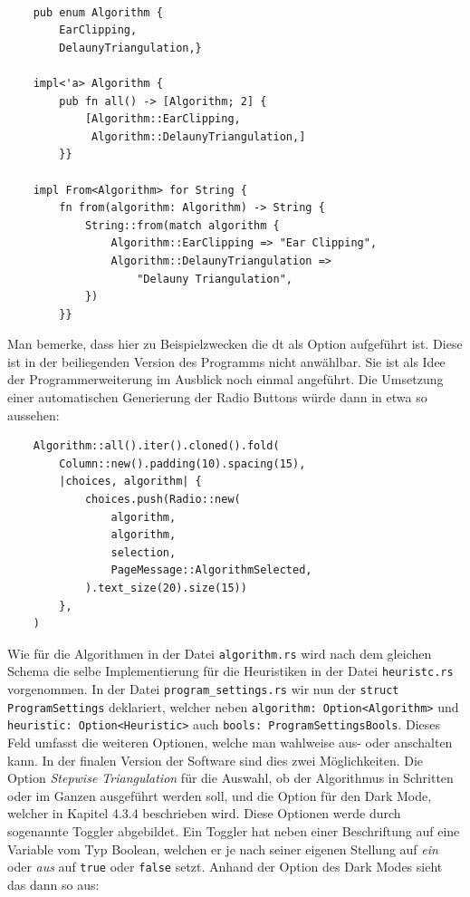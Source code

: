 \begin{lstlisting}

    pub enum Algorithm {
        EarClipping,
        DelaunyTriangulation,}

    impl<'a> Algorithm {
        pub fn all() -> [Algorithm; 2] {
            [Algorithm::EarClipping,
             Algorithm::DelaunyTriangulation,]
        }}

    impl From<Algorithm> for String {
        fn from(algorithm: Algorithm) -> String {
            String::from(match algorithm {
                Algorithm::EarClipping => "Ear Clipping",
                Algorithm::DelaunyTriangulation => 
                    "Delauny Triangulation",
            })
        }}
\end{lstlisting}
Man bemerke, dass hier zu Beispielzwecken die \ac{dt} als Option aufgeführt ist. Diese ist in der beiliegenden Version des Programms nicht anwählbar. Sie 
ist als Idee der Programmerweiterung im Ausblick noch einmal angeführt.
Die Umsetzung einer automatischen Generierung der Radio Buttons würde dann in etwa so aussehen:

\begin{lstlisting}
    Algorithm::all().iter().cloned().fold(
        Column::new().padding(10).spacing(15),
        |choices, algorithm| {
            choices.push(Radio::new(
                algorithm,
                algorithm,
                selection,
                PageMessage::AlgorithmSelected,
            ).text_size(20).size(15))
        },
    )
\end{lstlisting}

Wie für die Algorithmen in der Datei \lstinline{algorithm.rs} wird nach dem gleichen Schema die selbe Implementierung für die Heuristiken in der Datei \lstinline{heuristc.rs} vorgenommen.
In der Datei \lstinline{program_settings.rs} wir nun der \lstinline{struct ProgramSettings} deklariert, welcher neben  \lstinline{algorithm: Option<Algorithm>} und \lstinline{heuristic: Option<Heuristic>}
auch \lstinline{bools: ProgramSettingsBools}. Dieses Feld umfasst die weiteren Optionen, welche man wahlweise aus- oder anschalten kann. In der finalen Version der Software sind dies zwei Möglichkeiten.
Die Option \emph{Stepwise Triangulation} für die Auswahl, ob der Algorithmus in Schritten oder im Ganzen ausgeführt werden soll, und die Option für den Dark Mode, welcher in Kapitel 4.3.4 beschrieben wird.
Diese Optionen werde durch sogenannte Toggler abgebildet. Ein Toggler hat neben einer Beschriftung auf eine Variable vom Typ Boolean, welchen er je nach seiner eigenen Stellung auf \emph{ein} oder \emph{aus} auf 
\lstinline{true} oder \lstinline{false} setzt. Anhand der Option des Dark Modes sieht das dann so aus:


